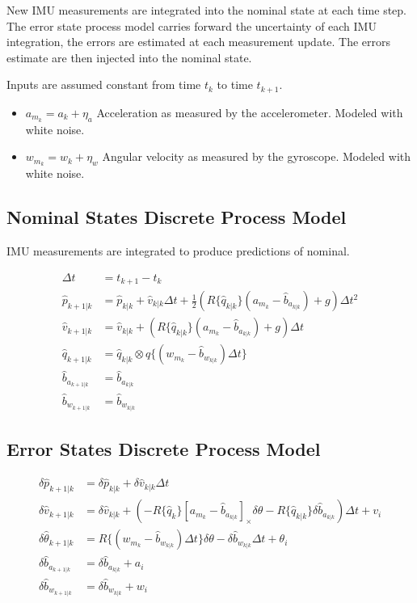 \documentclass[]{article}
\begin{document}
New IMU measurements are integrated into the nominal state at each time step. The error state process model carries forward the uncertainty of each IMU integration, the errors are estimated at each measurement update. The errors estimate are then injected into the nominal state.

Inputs are assumed constant from time $t_{k}$ to time $t_{k+1}$.

\begin{itemize}
	\item $a_{m_k} = a_k + \eta_{a}$ Acceleration as measured by the accelerometer. Modeled with white noise.
	\item $w_{m_k} = w_k + \eta_{w}$ Angular velocity as measured by the gyroscope. Modeled with white noise.
\end{itemize}

\subsection{Nominal States Discrete Process Model}

IMU measurements are integrated to produce predictions of nominal.

\begin{align}
\Delta t &= t_{k+1} - t_{k} \\
\hat{p}_{k+1|k} &= \hat{p}_{k|k} + \hat{v}_{k|k} \Delta t + \frac{1}{2}(R\{\hat{q}_{k|k}\}(a_{m_k} - \hat{b}_{a_{k|k}}) + g) \Delta t^2 \\
\hat{v}_{k+1|k} &=  \hat{v}_{k|k} + (R\{\hat{q}_{k|k}\}(a_{m_k} - \hat{b}_{a_{k|k}}) + g) \Delta t \\
\hat{q}_{k+1|k} &= \hat{q}_{k|k} \otimes q\{(w_{m_k} - \hat{b}_{w_{k|k}}) \Delta t\} \\
\hat{b}_{a_{k+1|k}} &= \hat{b}_{a_{k|k}} \\
\hat{b}_{w_{k+1|k}} &= \hat{b}_{w_{k|k}}
\end{align}

\subsection{Error States Discrete Process Model}
\begin{align}
\delta \hat{p}_{k+1|k} &= \delta \hat{p}_{k|k} + \delta \hat{v}_{k|k} \Delta t \\
\delta \hat{v}_{k+1|k} &= \delta \hat{v}_{k|k} + (-R\{\hat{q}_k\}[a_{m_k} - \hat{b}_{a_{k|k}}]_{\times} \delta \theta - R\{\hat{q}_{k|k}\} \delta \hat{b}_{a_{k|k}}) \Delta t  + v_i\\
\delta \hat{\theta}_{k+1|k} &= R\{(w_{m_k} - \hat{b}_{w_{k|k}})\Delta t\} \delta \theta - \delta \hat{b}_{w_{k|k}} \Delta t + \theta_{i}\\
\delta \hat{b}_{a_{k+1|k}} &= \delta \hat{b}_{a_{k|k}} + a_i \\
\delta \hat{b}_{w_{k+1|k}} &= \delta \hat{b}_{w_{k|k}} + w_i
\end{align}
\end{document}
